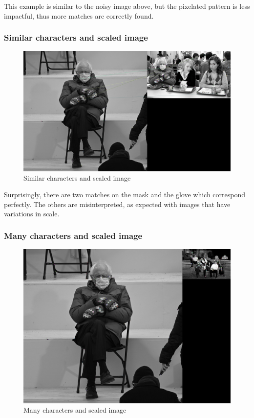\documentclass[12pt,a4paper]{report}
\begin{document}
This example is similar to the noisy image above, but the pixelated pattern is less impactful, thus more matches are correctly found.

\clearpage
\subsubsection*{Similar characters and scaled image}

\begin{figure}[ht]
	\centering
	\includegraphics[width=\textwidth]{bernieShoolLunch.jpeg_match}
	\caption{Similar characters and scaled image}
\end{figure}

Surprisingly, there are two matches on the mask and the glove which correspond perfectly. The others are misinterpreted, as expected with images that have variations in scale.

\clearpage
\subsubsection*{Many characters and scaled image}

\begin{figure}[ht]
	\centering
	\includegraphics[width=\textwidth]{BernieFriends.png_match}
	\caption{Many characters and scaled image}
\end{figure}
\end{document}

